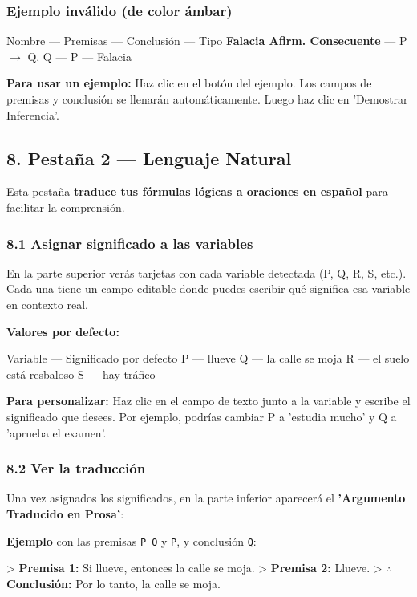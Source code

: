 \documentclass[11pt,a4paper]{article}
\begin{document}
\subsubsection{Ejemplo inválido (de color ámbar)}

Nombre --- Premisas --- Conclusión --- Tipo
\textbf{Falacia Afirm. Consecuente} --- P $ \to $ Q, Q --- P --- Falacia

\textbf{Para usar un ejemplo:} Haz clic en el botón del ejemplo. Los campos de premisas y conclusión se llenarán automáticamente. Luego haz clic en 'Demostrar Inferencia'.

\hrulefill

\subsection{8. Pestaña 2 --- Lenguaje Natural}

Esta pestaña \textbf{traduce tus fórmulas lógicas a oraciones en español} para facilitar la comprensión.

\subsubsection{8.1 Asignar significado a las variables}

En la parte superior verás tarjetas con cada variable detectada (P, Q, R, S, etc.). Cada una tiene un campo editable donde puedes escribir qué significa esa variable en contexto real.

\textbf{Valores por defecto:}

Variable --- Significado por defecto
P --- llueve
Q --- la calle se moja
R --- el suelo está resbaloso
S --- hay tráfico

\textbf{Para personalizar:} Haz clic en el campo de texto junto a la variable y escribe el significado que desees. Por ejemplo, podrías cambiar P a 'estudia mucho' y Q a 'aprueba el examen'.

\subsubsection{8.2 Ver la traducción}

Una vez asignados los significados, en la parte inferior aparecerá el \textbf{'Argumento Traducido en Prosa'}:

\textbf{Ejemplo} con las premisas \texttt{P  Q} y \texttt{P}, y conclusión \texttt{Q}:

> \textbf{Premisa 1:} Si llueve, entonces la calle se moja.
> \textbf{Premisa 2:} Llueve.
> \textbf{$ \therefore $ Conclusión:} Por lo tanto, la calle se moja.
\end{document}
